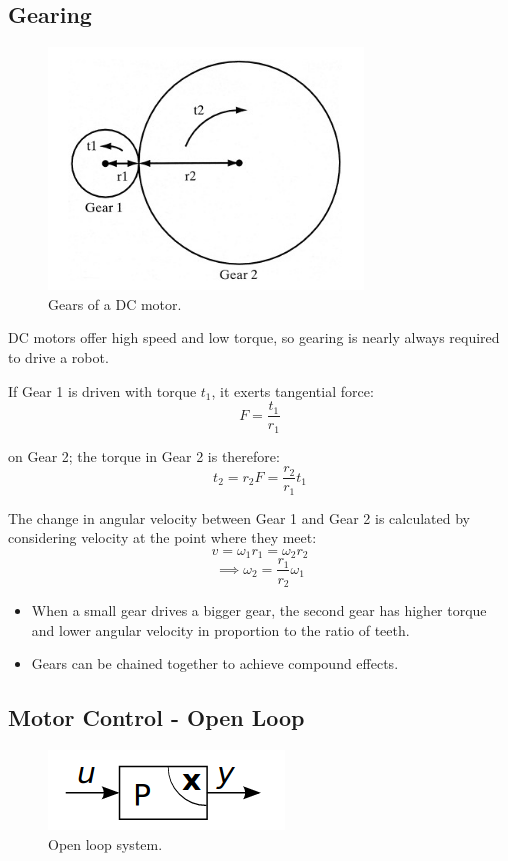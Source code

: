 \documentclass[11pt]{article}
\begin{document}
\subsection{Gearing}
\begin{figure}[h]
  \caption{Gears of a DC motor.}
  \includegraphics[scale=0.5]{gearing}
  \centering
\end{figure}

DC motors offer high speed and low torque, so gearing is nearly always required to drive a robot.

If Gear 1 is driven with torque $t_1$, it exerts tangential force:
\[
  F = \frac{t_1}{r_1}
\]

on Gear 2; the torque in Gear 2 is therefore:
\[
  t_2 = r_2F = \frac{r_2}{r_1}t_1
\]

The change in angular velocity between Gear 1 and Gear 2 is calculated by considering velocity at the point where they meet:
\[
  v = \omega_1 r_1 = \omega_2 r_2
\]
\[
  \implies \omega_2 = \frac{r_1}{r_2}\omega_1
\]
\begin{itemize}
  \item When a small gear drives a bigger gear, the second gear has higher torque and lower angular velocity in proportion to the ratio of teeth.
  \item Gears can be chained together to achieve compound effects.
\end{itemize}

\subsection{Motor Control - Open Loop}
\begin{figure}[h]
  \caption{Open loop system.}
  \includegraphics[scale=0.4]{openloop}
  \centering
\end{figure}
\end{document}
